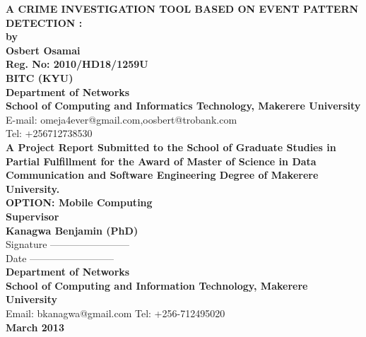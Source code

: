 
\begin{center}
{\bf \Large A CRIME INVESTIGATION TOOL BASED ON EVENT PATTERN DETECTION :\newline }\vspace{1cm} \\
 {\bf by}\\ {\bf Osbert Osamai  }\\
{\bf Reg. No: 2010/HD18/1259U}\\
{\bf BITC (KYU)}
 \\
{\bf Department of Networks}\\
{\bf School of Computing and Informatics Technology, Makerere University}\\ E-mail: omeja4ever@gmail.com,oosbert@trobank.com \\Tel: +256712738530
\vspace{2cm}\\

{\bf A Project Report Submitted to the School of Graduate Studies in Partial Fulfillment for the Award of Master of Science in Data Communication and Software Engineering Degree of Makerere University.}\\ 
{\bf OPTION: Mobile Computing} 
\vspace{1cm}\\ 
{\bf Supervisor}
\\{\bf Kanagwa Benjamin (PhD)}\\{Signature ------------------------}\\{Date   --------------------------}\\{\bf Department of Networks}\\
{\bf School of Computing and Information Technology, Makerere University}\\ Email:
bkanagwa@gmail.com  Tel: +256-712495020   \vspace{2cm}\\


{\bf March 2013 }
\end{center}


\makeatletter
    \def\thebibliography#1{\section*{References\@mkboth
      {REFERENCES}{REFERENCES}}\list
      {[\arabic{enumi}]}{\settowidth\labelwidth{[#1]}\leftmargin\labelwidth
	\advance\leftmargin\labelsep
	\usecounter{enumi}}
	\def\newblock{\hskip .11em plus .33em minus .07em}
	\sloppy\clubpenalty4000\widowpenalty4000
	\sfcode`\.=1000\relax}
    \makeatother
\newtheorem{defn}{Definition}[section]
\newcommand{\ud}{\underline}
\newcommand{\vs}{{\vspace{4.6mm}}}
\pagestyle{empty}
\linespread{2}

